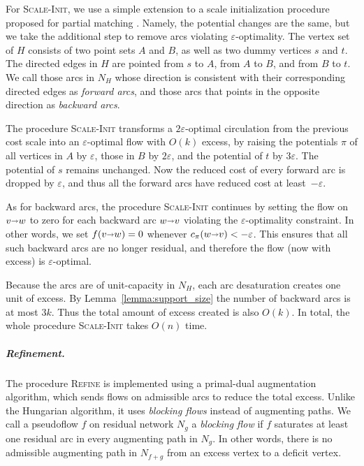 \documentclass[a4paper,UKenglish]{socg-lipics-v2018}
\def\eps{\varepsilon}
\def\arcto{\mathord\shortrightarrow}
\def\arc#1#2{#1\arcto#2}
\theoremstyle{plain}
\numberwithin{figure}{section}
\renewcommand{\paragraph}{\subparagraph}
\def\EMPH#1{\textcolor{BrickRed}{{\emph{#1}}}}
\begin{document}
For \textsc{Scale-Init}, we use a simple extension to a scale
initialization procedure proposed for partial matching \cite[Section~6.1]{GHKT17}.
Namely, the potential changes are the same, but we take the additional step
to remove arcs violating $\eps$-optimality.
The vertex set of $H$ consists of two point sets $A$ and $B$, as well as two dummy vertices $s$ and $t$.  The directed edges in $H$ are pointed from $s$ to $A$, from $A$ to $B$, and from $B$ to $t$.
We call those arcs in $N_H$ whose direction is consistent with their corresponding directed edges as \EMPH{forward arcs}, and those arcs that points in the opposite direction as \EMPH{backward arcs}.

The procedure \textsc{Scale-Init} transforms a $2\eps$-optimal circulation from the previous cost scale into an $\eps$-optimal flow with $O(k)$ excess, by raising the potentials $\pi$ of all vertices in $A$ by $\eps$, those in $B$ by $2\eps$, and the potential of $t$ by $3\eps$.
The potential of $s$ remains unchanged.
%
Now the reduced cost of every forward arc is dropped by $\eps$, and thus all the forward arcs have reduced cost at least~$-\eps$.

As for backward arcs, the procedure \textsc{Scale-Init} continues by setting the flow on $\arc vw$ to zero for each backward arc $\arc wv$ violating the $\eps$-optimality constraint.  In other words, we set $f(\arc vw) = 0$ whenever $c_\pi(\arc wv) < -\eps$.
This ensures that all such backward arcs are no longer residual, and therefore the flow (now with excess) is $\eps$-optimal.

Because the arcs are of unit-capacity in $N_H$, each arc desaturation creates one unit of excess.
By Lemma~\ref{lemma:support_size} the number of backward arcs is at most $3k$.
Thus the total amount of excess created is also $O(k)$.
%
In total,
the whole procedure \textsc{Scale-Init} takes $O(n)$ time.

\paragraph{Refinement.}

The procedure \textsc{Refine} is implemented using a primal-dual augmentation algorithm,
which sends flows on admissible arcs to reduce the total excess.
Unlike the Hungarian algorithm, it uses \emph{blocking flows} instead of augmenting paths.
%
We call a pseudoflow $f$ on residual network $N_g$ a \EMPH{blocking flow} if $f$ saturates at least one residual arc in every augmenting path in $N_g$.
In other words, there is no admissible augmenting path in $N_{f+g}$ from an excess vertex to a deficit vertex.
\end{document}
